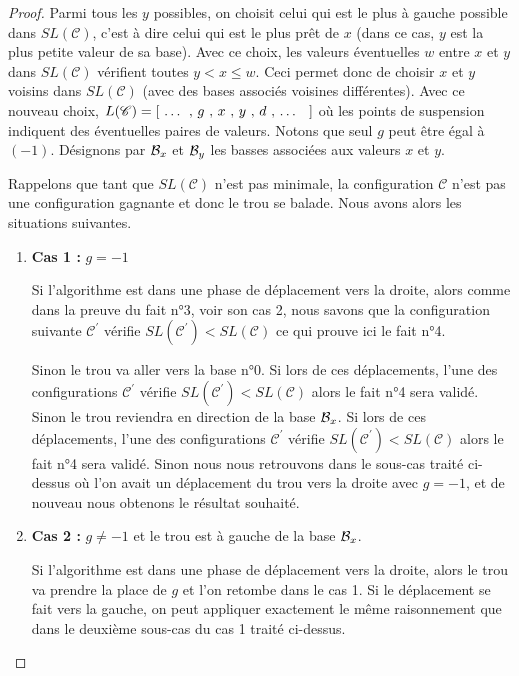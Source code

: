 \begin{proof}
	\medskip
	
	Parmi tous les $y$ possibles, on choisit celui qui est le plus à gauche possible dans $SL(\mathscr{C})$, c'est à dire celui qui est le plus prêt de $x$ (dans ce cas, $y$ est la plus petite valeur de sa base).
	Avec ce choix, les valeurs éventuelles $w$ entre $x$ et $y$ dans $SL(\mathscr{C})$ vérifient toutes $y < x \leqslant w$. Ceci permet donc de choisir $x$ et $y$ voisins dans $SL(\mathscr{C})$ (avec des bases associés voisines différentes).
	Avec ce nouveau choix, $L(\mathscr{C}) = [ \text{\ \dots{} , $g$ , $x$ , $y$ , $d$ , \dots{} \ } ]$ où les points de suspension indiquent des éventuelles paires de valeurs. Notons que seul $g$ peut être égal à $(-1)$.
	Désignons par ${\cal B}_x$ et ${\cal B}_y$ les basses associées aux valeurs $x$ et $y$.
	
	
	\medskip
	
	Rappelons que tant que $SL(\mathscr{C})$ n'est pas minimale, la configuration $\mathscr{C}$ n'est pas une configuration gagnante et donc le trou se balade. Nous avons alors les situations suivantes.
	
	\begin{enumerate}
		\item \textbf{Cas 1 :} $g = -1$
		
		Si l'algorithme est dans une phase de déplacement vers la droite, alors comme dans la preuve du fait n°3, voir son cas 2, nous savons que la configuration suivante $\mathscr{C}^\prime$ vérifie $SL(\mathscr{C}^\prime) < SL(\mathscr{C})$ ce qui prouve ici le fait n°4.
		
		Sinon le trou va aller vers la base n°0. Si lors de ces déplacements, l'une des configurations $\mathscr{C}^\prime$ vérifie $SL(\mathscr{C}^\prime) < SL(\mathscr{C})$ alors le fait n°4 sera validé. Sinon le trou reviendra en direction de la base ${\cal B}_x$. Si lors de ces déplacements, l'une des configurations $\mathscr{C}^\prime$ vérifie $SL(\mathscr{C}^\prime) < SL(\mathscr{C})$ alors le fait n°4 sera validé. Sinon nous nous retrouvons dans le sous-cas traité ci-dessus où l'on avait un déplacement du trou vers la droite avec $g = -1$, et de nouveau nous obtenons le résultat souhaité.
		
		\item \textbf{Cas 2 :} $g \neq -1$ et le trou est à gauche de la base ${\cal B}_x$. 
		
		Si l'algorithme est dans une phase de déplacement vers la droite, alors le trou va prendre la place de $g$ et l'on retombe dans le cas 1. Si le déplacement se fait vers la gauche, on peut appliquer exactement le même raisonnement que dans le deuxième sous-cas du cas 1 traité ci-dessus.
		

\end{enumerate}
\end{proof}
